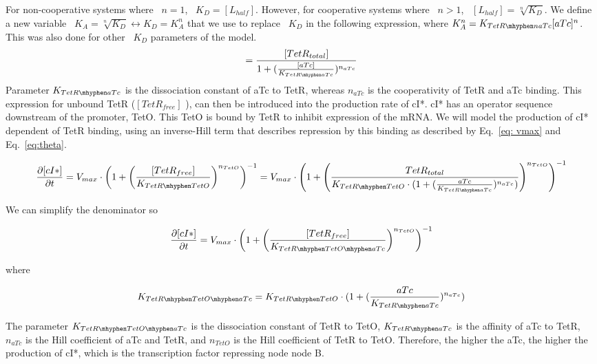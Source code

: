 For non-cooperative systems where ~$n=1$, ~$K_{D}=[L_{half}]$.
However, for cooperative systems where ~$n>1$, ~$[L_{half}] = \sqrt[n]{K_{D}}$.
We define a new variable ~$K_{A} = \sqrt[n]{K_{D}} \leftrightarrow K_{D} = K^n_{A}$
that we use to replace ~$K_{D}$ in the following expression,
where $K^n_{A} = K_{TetR \mhyphen naTc}{[aTc]^n}$.
This was also done for other ~$K_{D}$ parameters of the model.
\begin{equation}
[TetR_{free}] =  \frac{[TetR_{total}]}{1+(\frac{[aTc]}{K_{TetR \mhyphen aTc}})^{n_{aTc}}}
\end{equation}
Parameter $K_{TetR \mhyphen aTc}$ is the dissociation constant of aTc to TetR,
whereas $n_{aTc}$ is the cooperativity of TetR and aTc binding.
This expression for unbound TetR ($[TetR_{free}]$ ), can then be introduced into the production rate of cI*.
cI* has an operator sequence downstream of the promoter, TetO.
This TetO is bound by TetR to inhibit expression of the mRNA.
We will model the production of cI* dependent of TetR binding,
using an inverse-Hill term
that describes repression by this binding as described by Eq.~\ref{eq: vmax} and Eq.~\ref{eq:theta}.

\begin{equation}
    \pdv{[cI*]}{t} = V_{max}\cdot \left(1+\left(\frac{[TetR_{free}]}{K_{TetR \mhyphen TetO}}\right)^{n_{TetO}}\right)^{-1} = V_{max} \cdot \left(1+\left(\frac{TetR_{total}}{K_{TetR \mhyphen TetO}\cdot(1+(\frac{aTc}{K_{TetR \mhyphen aTc}})^{n_{aTc}})}\right)^{n_{TetO}}\right)^{-1}
\end{equation}

We can simplify the denominator so

\begin{equation}
    \pdv{[cI*]}{t} = V_{max}\cdot \left(1+\left(\frac{[TetR_{free}]}{K_{TetR \mhyphen TetO \mhyphen aTc }}\right)^{n_{TetO}}\right)^{-1}
\end{equation}

where

\begin{equation}
    K_{TetR \mhyphen TetO \mhyphen aTc}=K_{TetR \mhyphen TetO}\cdot(1+(\frac{aTc}{K_{TetR \mhyphen aTc}})^{n_{aTc}})
\end{equation}

The parameter $K_{TetR \mhyphen TetO \mhyphen aTc}$ is the dissociation constant of TetR to TetO, $K_{TetR \mhyphen aTc}$
is the affinity of aTc to TetR, $n_{aTc}$ is the Hill coefficient of aTc and TetR,
and $n_{TetO}$ is the Hill coefficient of TetR to TetO.
Therefore, the higher the aTc, the higher the production of cI*, which is the transcription factor repressing node node B.

